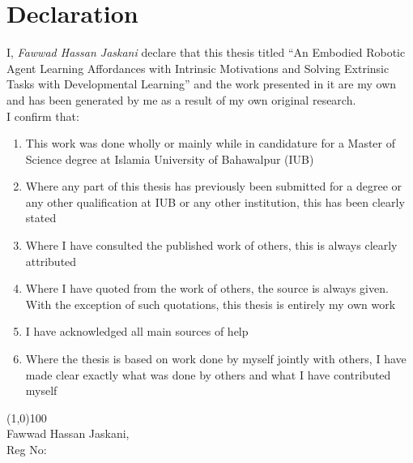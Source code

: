 \documentclass[11pt,a4paper]{report}
\numberwithin{equation}{section}
\begin{document}
    \newpage
    \chapter*{Declaration} %
    \label{cha:declaration}
    I, \textit{Fawwad Hassan Jaskani} declare that this thesis titled ``An Embodied Robotic Agent Learning Affordances with Intrinsic Motivations and Solving Extrinsic Tasks with Developmental Learning'' and the work presented in it are my own and has been generated by me as a result of my own original research. \\

    I confirm that:
    \begin{enumerate}
        \item This work was done wholly or mainly while in candidature for a Master of Science degree at Islamia University of Bahawalpur (IUB)
        \item Where any part of this thesis has previously been submitted for a degree or any other qualification at IUB or any other institution, this has been clearly stated
        \item Where I have consulted the published work of others, this is always clearly attributed
        \item Where I have quoted from the work of others, the source is always given. With the exception of such quotations, this thesis is entirely my own work
        \item I have acknowledged all main sources of help
        \item Where the thesis is based on work done by myself jointly with others, I have made clear exactly what was done by others and what I have contributed myself
    \end{enumerate}

    \begin{flushright}
        \line(1,0){100} \\
        Fawwad Hassan Jaskani, \\
        Reg No:
    \end{flushright}

    \newpage
\end{document}
